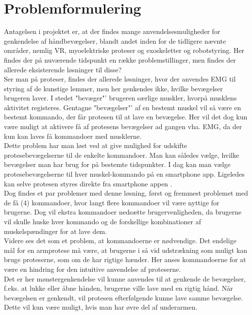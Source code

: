 \thispagestyle{fancy}
\chapter{Problemformulering}
\label{chp:problemformulering}

Antagelsen i projektet er, at der findes mange anvendelsesmuligheder for genkendelse af håndbevægelser, blandt andet inden for de tidligere nævnte områder, nemlig VR, myoelektriske proteser og exoskeletter og robotstyring. Her findes der på nuværende tidspunkt en række problemstillinger, men findes der allerede eksisterende løsninger til disse?\\

Ser man på proteser, findes der allerede løsninger, hvor der anvendes EMG til styring af de kunstige lemmer, men her genkendes ikke, hvilke bevægelser brugeren laver. I stedet "bevæger"' brugeren særlige muskler, hvorpå musklens aktivitet registeres. Gentagne "bevægelser"' af en bestemt muskel vil så være en bestemt kommando, der får protesen til at lave en bevægelse. Her vil det dog kun være muligt at aktivere få af protesens bevægelser ad gangen vha. EMG, da der kun kan laves få kommandoer med musklerne. \\

Dette problem har man løst ved at give mulighed for udskifte protesebevægelserne til de enkelte kommandoer. Man kan således vælge, hvilke bevægelser man har brug for på bestemte tidspunkter. I dag kan man vælge protesebevægelserne til hver muskel-kommando på en smartphone app. Ligeledes kan selve protesen styres direkte fra smartphone appen \citep{RefWorks:12}.\\
Dog findes et par problemer med denne løsning, først og fremmest problemet med de få (4) kommandoer, hvor langt flere kommandoer vil være nyttige for brugerne. Dog vil ekstra kommandoer nedsætte brugervenligheden, da brugerne vil skulle huske hver kommando og de forskellige kombinationer af muskelspændinger for at lave dem.\\

Videre ses det som et problem, at kommandoerne er nødvendige. Det endelige mål for en armprotese må være, at brugerne i så vid udstrækning som muligt kan bruge proteserne, som om de har rigtige hænder. Her anses kommandoerne for at være en hindring for den intuitive anvendelse af proteserne.\\

Det er her mønstergenkendelse vil kunne anvendes til at genkende de bevægelser, f.eks. at lukke eller åbne hånden, brugerne ville lave med en rigtig hånd. Når bevægelsen er genkendt, vil protesen efterfølgende kunne lave samme bevægelse. Dette vil kun være muligt, hvis man har øvre del af underarmen. \\

